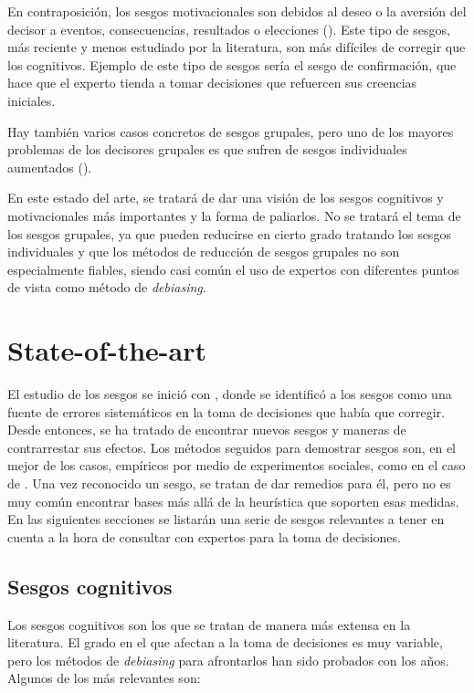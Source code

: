 \documentclass[a4paper,11pt]{article}
\begin{document}
En contraposición, los sesgos motivacionales son debidos al deseo o la aversión del decisor a eventos, consecuencias, resultados o elecciones (\cite{kunda1990}). Este tipo de sesgos, más reciente y menos estudiado por la literatura, son más difíciles de corregir que los cognitivos. Ejemplo de este tipo de sesgos sería el sesgo de confirmación, que hace que el experto tienda a tomar decisiones que refuercen sus creencias iniciales.

Hay también varios casos concretos de sesgos grupales, pero uno de los mayores problemas de los decisores grupales es que sufren de sesgos individuales aumentados (\cite{kerr2004}).

En este estado del arte, se tratará de dar una visión de los sesgos cognitivos y motivacionales más importantes y la forma de paliarlos. No se tratará el tema de los sesgos grupales, ya que pueden reducirse en cierto grado tratando los sesgos individuales y que los métodos de reducción de sesgos grupales no son especialmente fiables, siendo casi común el uso de expertos con diferentes puntos de vista como método de \textit{debiasing}.


\section{State-of-the-art}
El estudio de los sesgos se inició con \cite{tversky1974}, donde se identificó a los sesgos como una fuente de errores sistemáticos en la toma de decisiones que había que corregir. Desde entonces, se ha tratado de encontrar nuevos sesgos y maneras de contrarrestar sus efectos. Los métodos seguidos para demostrar sesgos son, en el mejor de los casos, empíricos por medio de experimentos sociales, como en el caso de \cite{moore2008}. Una vez reconocido un sesgo, se tratan de dar remedios para él, pero no es muy común encontrar bases más allá de la heurística que soporten esas medidas. En las siguientes secciones se listarán una serie de sesgos relevantes a tener en cuenta a la hora de consultar con expertos para la toma de decisiones.

\subsection{Sesgos cognitivos}
Los sesgos cognitivos son los que se tratan de manera más extensa en la literatura. El grado en el que afectan a la toma de decisiones es muy variable, pero los métodos de \textit{debiasing} para afrontarlos han sido probados con los años. Algunos de los más relevantes son:
\end{document}

